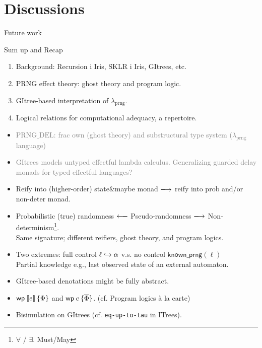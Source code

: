 \documentclass[8pt]{beamer}
\newcommand{\prng}{\mathrm{prng}}
\newcommand{\knownprng}{\textsf{known\_prng}}
\newcommand{\demph}[1]{\textcolor{gray}{#1}}
\begin{document}
  \section{Discussions}
  \begin{frame}{Future work}
    \begin{block}{Sum up and Recap}
      \begin{enumerate}
        \item Background: Recursion i Iris, SKLR i Iris, GItrees, etc.
        \item PRNG effect theory: ghost theory and program logic.
        \item GItree-based interpretation of \(\lambda_\prng\).
        \item Logical relations for computational adequacy, a repertoire.
      \end{enumerate}
    \end{block}

    \pause
    \vfill

    \small
    \begin{itemize}
      \item \demph{\(\mathrm{PRNG\_DEL}\): frac own (ghost theory) and substructural type system (\(\lambda_\prng\) language)}
      \item \demph{GItrees models untyped effectful lambda calculus.
        Generalizing guarded delay monads for typed effectful languages?}
      \item Reify into (higher-order) state\&maybe monad \(\xlongrightarrow{}\) reify into prob and/or non-deter monad.
      \item Probabilistic (true) randomness \(\xlongleftarrow{}\) Pseudo-randomness \(\xlongrightarrow{}\) Non-determinism\footnote{\(\forall\) / \(\exists\). Must/May}.\\
        Same signature; different reifiers, ghost theory, and program logics.
      \item Two extremes: full control \(\ell \hookrightarrow \alpha\) v.s. no control \(\knownprng(\ell)\)\\
        Partial knowledge e.g., last observed state of an external automaton.
      \item GItree-based denotations might be fully abstract.
      \item \(\wpre{\sem{e}}{\Phi}\) and \(\wpre{e}{\overline{\Phi}}\). (cf. Program logics \`a la carte)
      \item Bisimulation on GItrees (cf. \texttt{eq-up-to-tau} in ITrees).
    \end{itemize}
  \end{frame}
\end{document}
